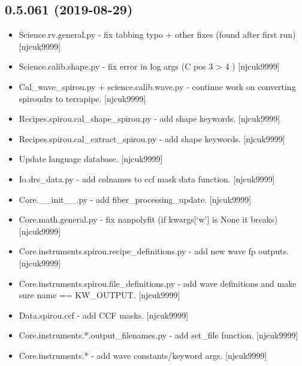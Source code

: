 \documentclass[a4paper,10pt,english]{report}
\begin{document}
\subsection{0.5.061 (2019-08-29)}
\label{\detokenize{misc/changelog:id80}}\begin{itemize}
\item {} 
Science.rv.general.py - fix tabbing typo + other fixes (found after
first run) {[}njcuk9999{]}

\item {} 
Science.calib.shape.py - fix error in log args (C  pos 3 \textendash{}\textgreater{} 4 )
{[}njcuk9999{]}

\item {} 
Cal\_wave\_spirou.py + science.calib.wave.py - continue work on
converting spiroudrs to terrapipe. {[}njcuk9999{]}

\item {} 
Recipes.spirou.cal\_shape\_spirou.py - add shape keywords. {[}njcuk9999{]}

\item {} 
Recipes.spirou.cal\_extract\_spirou.py - add shape keywords. {[}njcuk9999{]}

\item {} 
Update language database. {[}njcuk9999{]}

\item {} 
Io.drs\_data.py - add colnames to ccf mask data function. {[}njcuk9999{]}

\item {} 
Core.\_\_init\_\_.py - add fiber\_processing\_update. {[}njcuk9999{]}

\item {} 
Core.math.general.py - fix nanpolyfit (if kwargs{[}‘w’{]} is None it
breaks) {[}njcuk9999{]}

\item {} 
Core.instruments.spirou.recipe\_definitions.py - add new wave fp
outputs. {[}njcuk9999{]}

\item {} 
Core.instruments.spirou.file\_definitions.py - add wave definitions and
make sure name == KW\_OUTPUT. {[}njcuk9999{]}

\item {} 
Data.spirou.ccf - add CCF masks. {[}njcuk9999{]}

\item {} 
Core.instruments.*.output\_filenames.py - add set\_file function.
{[}njcuk9999{]}

\item {} 
Core.instruments.* - add wave constants/keyword args. {[}njcuk9999{]}


\end{itemize}
\end{document}
